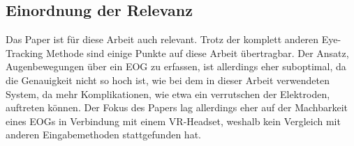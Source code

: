 \subsection{Einordnung der Relevanz}
Das Paper ist für diese Arbeit auch relevant. Trotz der komplett anderen Eye-Tracking Methode sind einige Punkte auf diese Arbeit übertragbar. Der Ansatz, Augenbewegungen über ein EOG zu erfassen, ist allerdings eher suboptimal, da die Genauigkeit nicht so hoch ist, wie bei dem in dieser Arbeit verwendeten System, da mehr Komplikationen, wie etwa ein verrutschen der Elektroden, auftreten können. Der Fokus des Papers lag allerdings eher auf der Machbarkeit eines EOGs in Verbindung mit einem VR-Headset, weshalb kein Vergleich mit anderen Eingabemethoden stattgefunden hat. 




